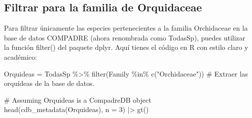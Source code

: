 \documentclass[
  12pt,
  letterpaper,
]{book}
\newenvironment{Shaded}{\begin{snugshade}}{\end{snugshade}}
\newcommand{\AttributeTok}[1]{\textcolor[rgb]{0.40,0.45,0.13}{#1}}
\newcommand{\CommentTok}[1]{\textcolor[rgb]{0.37,0.37,0.37}{#1}}
\newcommand{\DecValTok}[1]{\textcolor[rgb]{0.68,0.00,0.00}{#1}}
\newcommand{\FunctionTok}[1]{\textcolor[rgb]{0.28,0.35,0.67}{#1}}
\newcommand{\NormalTok}[1]{\textcolor[rgb]{0.00,0.23,0.31}{#1}}
\newcommand{\OtherTok}[1]{\textcolor[rgb]{0.00,0.23,0.31}{#1}}
\newcommand{\SpecialCharTok}[1]{\textcolor[rgb]{0.37,0.37,0.37}{#1}}
\newcommand{\StringTok}[1]{\textcolor[rgb]{0.13,0.47,0.30}{#1}}
\begin{document}
\subsection{Filtrar para la familia de
Orquidaceae}\label{filtrar-para-la-familia-de-orquidaceae}

Para filtrar únicamente las especies pertenecientes a la familia
Orchidaceae en la base de datos COMPADRE (ahora renombrada como
TodasSp), puedes utilizar la función filter() del paquete dplyr. Aquí
tienes el código en R con estilo claro y académico:

\begin{Shaded}
\begin{Highlighting}[]
\NormalTok{Orquideas }\OtherTok{=}\NormalTok{ TodasSp }\SpecialCharTok{\%\textgreater{}\%}
  \FunctionTok{filter}\NormalTok{(Family }\SpecialCharTok{\%in\%} \FunctionTok{c}\NormalTok{(}\StringTok{"Orchidaceae"}\NormalTok{)) }\CommentTok{\# Extraer las orquídeas de la base de datos.}


\CommentTok{\# Assuming Orquideas is a CompadreDB object}
\FunctionTok{head}\NormalTok{(}\FunctionTok{cdb\_metadata}\NormalTok{(Orquideas), }\AttributeTok{n =} \DecValTok{3}\NormalTok{) }\SpecialCharTok{|\textgreater{}} 
  \FunctionTok{gt}\NormalTok{()}
\end{Highlighting}
\end{Shaded}
\end{document}
